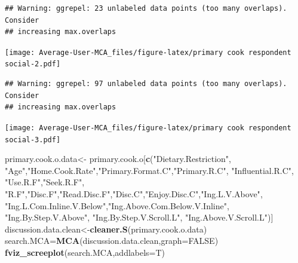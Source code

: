 \documentclass[
]{article}
\newenvironment{Shaded}{\begin{snugshade}}{\end{snugshade}}
\newcommand{\DataTypeTok}[1]{\textcolor[rgb]{0.13,0.29,0.53}{#1}}
\newcommand{\KeywordTok}[1]{\textcolor[rgb]{0.13,0.29,0.53}{\textbf{#1}}}
\newcommand{\NormalTok}[1]{#1}
\newcommand{\OtherTok}[1]{\textcolor[rgb]{0.56,0.35,0.01}{#1}}
\newcommand{\StringTok}[1]{\textcolor[rgb]{0.31,0.60,0.02}{#1}}
\begin{document}
\begin{verbatim}
## Warning: ggrepel: 23 unlabeled data points (too many overlaps). Consider
## increasing max.overlaps
\end{verbatim}

\texttt{[image: Average-User-MCA\_files/figure-latex/primary cook respondent social-2.pdf]}

\begin{Shaded}
\end{Shaded}

\begin{verbatim}
## Warning: ggrepel: 97 unlabeled data points (too many overlaps). Consider
## increasing max.overlaps
\end{verbatim}

\texttt{[image: Average-User-MCA\_files/figure-latex/primary cook respondent social-3.pdf]}

\begin{Shaded}
\begin{Highlighting}[]
\NormalTok{primary.cook.o.data<-}\StringTok{ }\NormalTok{primary.cook.o[}\KeywordTok{c}\NormalTok{(}\StringTok{"Dietary.Restriction"}\NormalTok{, }\StringTok{"Age"}\NormalTok{,}\StringTok{"Home.Cook.Rate"}\NormalTok{,}\StringTok{"Primary.Format.C"}\NormalTok{,}\StringTok{"Primary.R.C"}\NormalTok{, }\StringTok{"Influential.R.C"}\NormalTok{, }
            \StringTok{"Use.R.F"}\NormalTok{,}\StringTok{"Seek.R.F"}\NormalTok{, }\StringTok{"R.F"}\NormalTok{,}\StringTok{"Disc.F"}\NormalTok{,}\StringTok{"Read.Disc.F"}\NormalTok{,}\StringTok{"Disc.C"}\NormalTok{,}\StringTok{"Enjoy.Disc.C"}\NormalTok{,}\StringTok{"Ing.L.V.Above"}\NormalTok{,}
            \StringTok{"Ing.L.Com.Inline.V.Below"}\NormalTok{,}\StringTok{"Ing.Above.Com.Below.V.Inline"}\NormalTok{,  }\StringTok{"Ing.By.Step.V.Above"}\NormalTok{,  }\StringTok{"Ing.By.Step.V.Scroll.L"}\NormalTok{,}
            \StringTok{"Ing.Above.V.Scroll.L"}\NormalTok{)]}
\NormalTok{discussion.data.clean<-}\KeywordTok{cleaner.S}\NormalTok{(primary.cook.o.data)}
\NormalTok{search.MCA=}\KeywordTok{MCA}\NormalTok{(discussion.data.clean,}\DataTypeTok{graph=}\OtherTok{FALSE}\NormalTok{)}
\KeywordTok{fviz_screeplot}\NormalTok{(search.MCA,}\DataTypeTok{addlabels=}\NormalTok{T)}
\end{Highlighting}
\end{Shaded}
\end{document}

